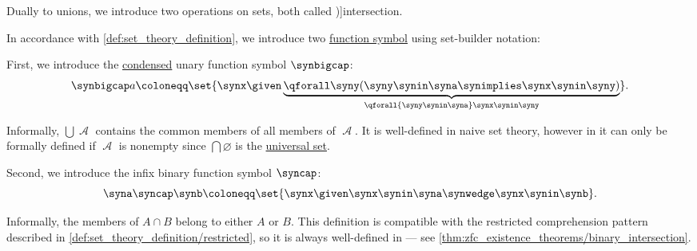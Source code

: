 \begin{definition}\label{def:set_intersection}
  Dually to unions, we introduce two operations on sets, both called \term[ru=пересечение (\cite[6]{ШеньВерещагин2020НачалаТеорииМножеств})]{intersection}.

  In accordance with \cref{def:set_theory_definition}, we introduce two \hyperref[def:fol_signature/function]{function symbol} using set-builder notation:
  \begin{thmenum}
     First, we introduce the \hyperref[def:fol_signature/notation]{condensed} unary function symbol \( {\synbigcap} \):
    \begin{equation*}
      \synbigcap a \coloneqq \set{ \synx \given \underbrace{\qforall \syny (\syny \synin \syna \synimplies \synx \synin \syny)}_{\qforall {\syny \synin \syna} \synx \synin \syny} }.
    \end{equation*}

    Informally, \( \bigcup \mscrA \) contains the common members of all members of \( \mscrA \). It is well-defined in naive set theory, however in \hyperref[def:zfc]{} it can only be formally defined if \( \mscrA \) is nonempty since \( \bigcap \varnothing \) is the \hyperref[def:universal_set]{universal set}.

     Second, we introduce the infix binary function symbol \( {\syncap} \):
    \begin{equation*}
      \syna \syncap \synb \coloneqq \set{ \synx \given \synx \synin \syna \synwedge \synx \synin \synb }.
    \end{equation*}

    Informally, the members of \( A \cap B \) belong to either \( A \) or \( B \). This definition is compatible with the restricted comprehension pattern described in \cref{def:set_theory_definition/restricted}, so it is always well-defined in \hyperref[def:zfc]{} --- see \cref{thm:zfc_existence_theorems/binary_intersection}.
  \end{thmenum}
\end{definition}

